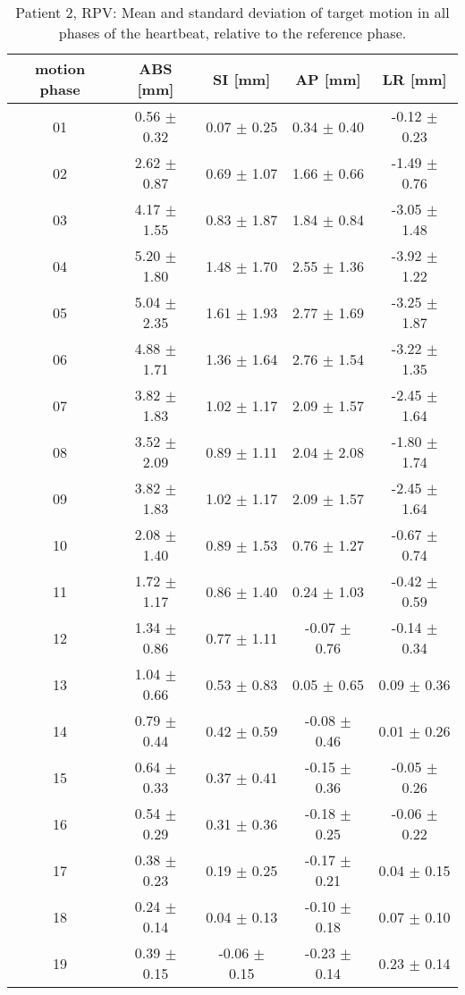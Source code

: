 \begin{table}[htbp]
  \centering
    \tiny
  \caption{Patient 2, RPV: Mean and standard deviation of target motion in all phases of the heartbeat, relative to the reference phase.}
  \begin{tabular}{|c|c|c|c|c|}
    \hline\hline
    motion phase\rule{0pt}{2.6ex}\rule[-1.2ex]{0pt}{0pt} & ABS [mm] & SI [mm] & AP [mm] & LR [mm]\\
    \hline
01& 0.56 $\pm$ 0.32& 0.07 $\pm$ 0.25& 0.34 $\pm$ 0.40& -0.12 $\pm$ 0.23 \\
02& 2.62 $\pm$ 0.87& 0.69 $\pm$ 1.07& 1.66 $\pm$ 0.66& -1.49 $\pm$ 0.76 \\
03& 4.17 $\pm$ 1.55& 0.83 $\pm$ 1.87& 1.84 $\pm$ 0.84& -3.05 $\pm$ 1.48 \\
04& 5.20 $\pm$ 1.80& 1.48 $\pm$ 1.70& 2.55 $\pm$ 1.36& -3.92 $\pm$ 1.22 \\
05& 5.04 $\pm$ 2.35& 1.61 $\pm$ 1.93& 2.77 $\pm$ 1.69& -3.25 $\pm$ 1.87 \\
06& 4.88 $\pm$ 1.71& 1.36 $\pm$ 1.64& 2.76 $\pm$ 1.54& -3.22 $\pm$ 1.35 \\
07& 3.82 $\pm$ 1.83& 1.02 $\pm$ 1.17& 2.09 $\pm$ 1.57& -2.45 $\pm$ 1.64 \\
08& 3.52 $\pm$ 2.09& 0.89 $\pm$ 1.11& 2.04 $\pm$ 2.08& -1.80 $\pm$ 1.74 \\
09& 3.82 $\pm$ 1.83& 1.02 $\pm$ 1.17& 2.09 $\pm$ 1.57& -2.45 $\pm$ 1.64 \\
10& 2.08 $\pm$ 1.40& 0.89 $\pm$ 1.53& 0.76 $\pm$ 1.27& -0.67 $\pm$ 0.74 \\
11& 1.72 $\pm$ 1.17& 0.86 $\pm$ 1.40& 0.24 $\pm$ 1.03& -0.42 $\pm$ 0.59 \\
12& 1.34 $\pm$ 0.86& 0.77 $\pm$ 1.11& -0.07 $\pm$ 0.76& -0.14 $\pm$ 0.34 \\
13& 1.04 $\pm$ 0.66& 0.53 $\pm$ 0.83& 0.05 $\pm$ 0.65& 0.09 $\pm$ 0.36 \\
14& 0.79 $\pm$ 0.44& 0.42 $\pm$ 0.59& -0.08 $\pm$ 0.46& 0.01 $\pm$ 0.26 \\
15& 0.64 $\pm$ 0.33& 0.37 $\pm$ 0.41& -0.15 $\pm$ 0.36& -0.05 $\pm$ 0.26 \\
16& 0.54 $\pm$ 0.29& 0.31 $\pm$ 0.36& -0.18 $\pm$ 0.25& -0.06 $\pm$ 0.22 \\
17& 0.38 $\pm$ 0.23& 0.19 $\pm$ 0.25& -0.17 $\pm$ 0.21& 0.04 $\pm$ 0.15 \\
18& 0.24 $\pm$ 0.14& 0.04 $\pm$ 0.13& -0.10 $\pm$ 0.18& 0.07 $\pm$ 0.10 \\
19& 0.39 $\pm$ 0.15& -0.06 $\pm$ 0.15& -0.23 $\pm$ 0.14& 0.23 $\pm$ 0.14 \\
    \hline\hline
  \end{tabular}
\end{table}


